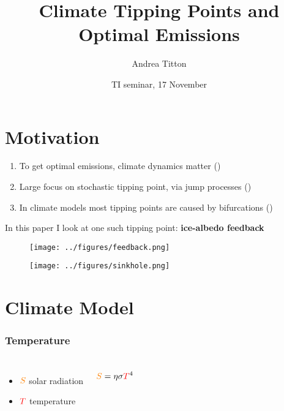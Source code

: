 \documentclass[pdf]{beamer}
\author{Andrea Titton}
\title[Climate Tipping Points and Optimal Emissions]{\small Climate Tipping Points and\\ Optimal Emissions}
\institute{CeNDEF, University of Amsterdam}
\date{TI seminar, 17 November}
\begin{document}
\frame[plain]{\titlepage}

\section{Motivation}
\begin{frame}
    \begin{enumerate}
        \item To get optimal emissions, climate dynamics matter (\cite{dietz_are_2020, dietz_economic_2021})
        \pause \item Large focus on stochastic tipping point, via jump processes (\cite{van_den_bremer_risk-adjusted_2021,lin_social_2023})
        \pause \item In climate models most tipping points are caused by bifurcations (\cite{ashwin_tipping_2012,ashwin_extreme_2020})
    \end{enumerate}
\end{frame}

\begin{frame}
    In this paper I look at one such tipping point: \textbf{ice-albedo feedback}

    \pause \begin{figure}
        \centering
        \texttt{[image: ../figures/feedback.png]}
    \end{figure}
\end{frame}


\begin{frame}
    \centering
    \begin{figure}
        \texttt{[image: ../figures/sinkhole.png]}
    \end{figure}
\end{frame}


\section{Climate Model}

\begin{frame} \frametitle{Temperature}
    \begin{columns}
        \begin{itemize}
            \item ${\color{orange} S}$ solar radiation
            \item ${\color{red} T}$ temperature
        \end{itemize}
        \begin{equation*}
            {\color{orange} S} = \eta \sigma {\color{red} T}^4
        \end{equation*}
    \end{columns}
\end{frame}
\end{document}
